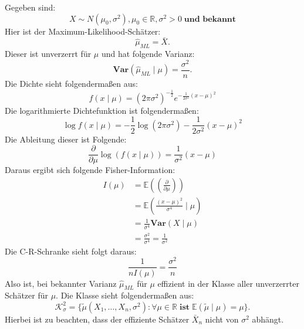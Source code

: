 \documentclass[10pt]{article}
\newcommand{\FZV}{X_1, \ldots, X_n} %
\newcommand{\IR}{\mathbb{R}} %
\newcommand{\EW}{\mathbb{E}} %
\newcommand{\Var}{\textbf{Var}} %
\newenvironment{BSP}[1][]
{\begin{Beispiel}[frametitle=#1]}{\end{Beispiel}}
\begin{document}
	\begin{BSP}[Beispiel 1.4.5 (Anwendung der C-R-Schranke Normalverteilung mit bekannter Varianz)]
		Gegeben sind:
		\begin{equation*}
			X \sim N(\mu_0, \sigma^2), \mu_0 \in \IR, \sigma^2 > 0 \; \textbf{und bekannt}
		\end{equation*}
		Hier ist der Maximum-Likelihood-Schätzer:
		\begin{equation*}
			\hat{\mu}_{ML} = \bar{X}. 
		\end{equation*}
		Dieser ist unverzerrt für $\mu$ und hat folgende Varianz:
		\begin{equation*}
			\Var(\hat{\mu}_{ML} \mid \mu) = \frac{\sigma^2}{n}.
		\end{equation*}
		Die Dichte sieht folgendermaßen aus:
		\begin{equation*}
			f(x \mid \mu) = (2\pi \sigma^2)^{-\frac{1}{2}} e^{-\frac{1}{2\sigma^2}(x-\mu)^2}
		\end{equation*}
		Die logarithmierte Dichtefunktion ist folgendermaßen:
		\begin{equation*}
			\log f(x \mid \mu) = -\frac{1}{2} \log (2\pi \sigma^2) - \frac{1}{2 \sigma^2} (x-\mu)^2
		\end{equation*}
		Die Ableitung dieser ist Folgende:
		\begin{equation*}
			\frac{\partial}{\partial \mu} \log(f(x \mid \mu)) = \frac{1}{\sigma^2} (x-\mu)
		\end{equation*}
		Daraus ergibt sich folgende Fisher-Information:
		\begin{equation*}
			\begin{split}
				I(\mu) &= \EW\left(\left(\frac{\partial}{\partial \mu }\right)\right)\\
				&= \EW\left(\frac{(x-\mu)^2}{\sigma^4} \mid \mu \right)\\
				&= \frac{1}{\sigma^4} \Var(X \mid \mu)\\
				&= \frac{\sigma^2}{\sigma^4} = \frac{1}{\sigma^2}
			\end{split} 
		\end{equation*}
		Die C-R-Schranke sieht folgt daraus:
		\begin{equation*}
			\frac{1}{nI(\mu)}= \frac{\sigma^2}{n}
		\end{equation*}
		Also ist, bei bekannter Varianz $\hat{\mu}_{ML}$ für $\mu$ effizient in der Klasse aller unverzerrter Schätzer für $\mu$. 
		Die Klasse sieht folgendermaßen aus:
		\begin{equation*}
			\mathcal{K}_\sigma^2 = \{\tilde{\mu}(\FZV, \sigma^2): \forall \mu \in \IR \; \textbf{ist} \; \EW(\tilde{\mu} \mid \mu) = \mu\}.
		\end{equation*}
		Hierbei ist zu beachten, dass der effiziente Schätzer $\bar{X}_n$ nicht von $\sigma^2$ abhängt. 
	\end{BSP}
\end{document}
